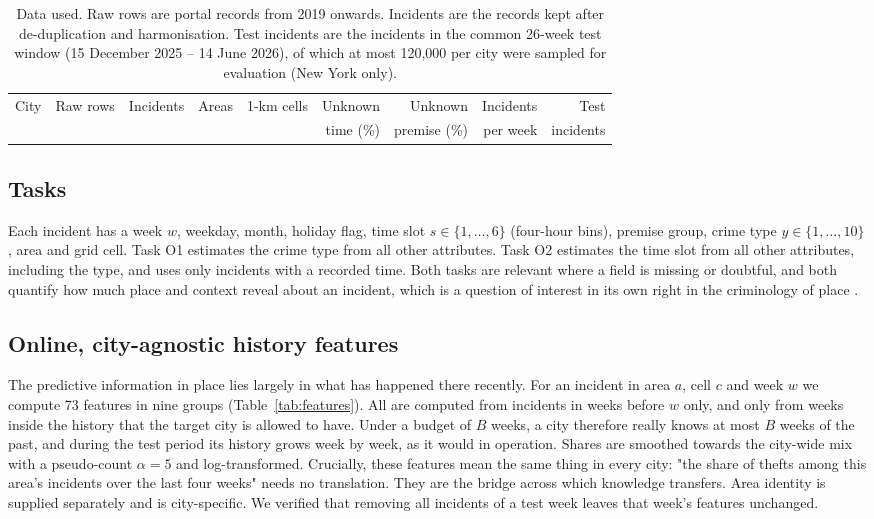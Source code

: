 \documentclass[11pt]{article}
\begin{document}
\begin{table}[!htbp]
\centering
\caption{Data used. Raw rows are portal records from 2019 onwards. Incidents are the records kept after de-duplication and harmonisation. Test incidents are the incidents in the common 26-week test window (15 December 2025 -- 14 June 2026), of which at most 120,000 per city were sampled for evaluation (New York only).}
\label{tab:data}
\footnotesize
\setlength{\tabcolsep}{3.5pt}
\begin{tabular}{lrrrrrrrr}
\toprule
City & Raw rows & Incidents & Areas & 1-km cells & Unknown & Unknown & Incidents & Test \\
 & & & & & time (\%) & premise (\%) & per week & incidents \\
\midrule

\bottomrule
\end{tabular}
\end{table}

\subsection{Tasks}
Each incident has a week $w$, weekday, month, holiday flag, time slot $s\in\{1,\dots,6\}$ (four-hour bins), premise group, crime type $y\in\{1,\dots,10\}$, area and grid cell. Task O1 estimates the crime type from all other attributes. Task O2 estimates the time slot from all other attributes, including the type, and uses only incidents with a recorded time. Both tasks are relevant where a field is missing or doubtful, and both quantify how much place and context reveal about an incident, which is a question of interest in its own right in the criminology of place \citep{weisburd2015}.

\subsection{Online, city-agnostic history features}\label{sec:features}
The predictive information in place lies largely in what has happened there recently. For an incident in area $a$, cell $c$ and week $w$ we compute 73 features in nine groups (Table~\ref{tab:features}). All are computed from incidents in weeks before $w$ only, and only from weeks inside the history that the target city is allowed to have. Under a budget of $B$ weeks, a city therefore really knows at most $B$ weeks of the past, and during the test period its history grows week by week, as it would in operation. Shares are smoothed towards the city-wide mix with a pseudo-count $\alpha=5$ and log-transformed. Crucially, these features mean the same thing in every city: "the share of thefts among this area's incidents over the last four weeks" needs no translation. They are the bridge across which knowledge transfers. Area identity is supplied separately and is city-specific. We verified that removing all incidents of a test week leaves that week's features unchanged.
\end{document}
